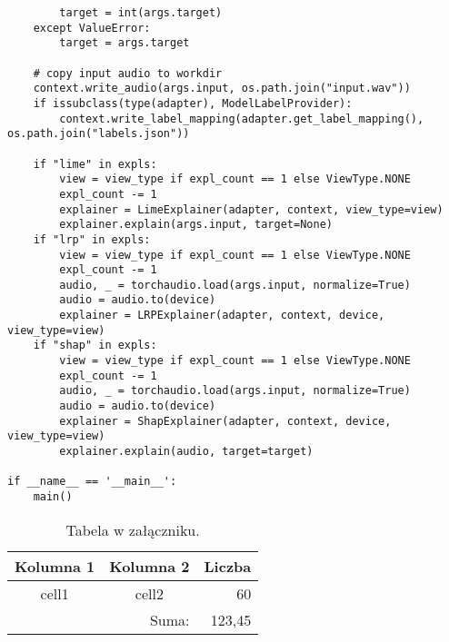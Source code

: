\documentclass[
    bindingoffset=5mm,  %
    footnoteindent=3mm, %
    hyphenation=true    %
]{src/wut-thesis}
\begin{document}
\begin{verbatim}
        target = int(args.target)
    except ValueError:
        target = args.target

    # copy input audio to workdir
    context.write_audio(args.input, os.path.join("input.wav"))
    if issubclass(type(adapter), ModelLabelProvider):
        context.write_label_mapping(adapter.get_label_mapping(), os.path.join("labels.json"))
    
    if "lime" in expls:
        view = view_type if expl_count == 1 else ViewType.NONE
        expl_count -= 1
        explainer = LimeExplainer(adapter, context, view_type=view)
        explainer.explain(args.input, target=None)
    if "lrp" in expls:
        view = view_type if expl_count == 1 else ViewType.NONE
        expl_count -= 1
        audio, _ = torchaudio.load(args.input, normalize=True)
        audio = audio.to(device)
        explainer = LRPExplainer(adapter, context, device, view_type=view)
    if "shap" in expls:
        view = view_type if expl_count == 1 else ViewType.NONE
        expl_count -= 1
        audio, _ = torchaudio.load(args.input, normalize=True)
        audio = audio.to(device)
        explainer = ShapExplainer(adapter, context, device, view_type=view)
        explainer.explain(audio, target=target)

if __name__ == '__main__':
    main()
\end{verbatim}

\clearpage
{}
\lipsum[1-2]
\begin{table}[!h] \centering
    \caption{Tabela w załączniku.}
    \begin{tabular} {| c | c | r |} \hline
        Kolumna 1       & Kolumna 2 & Liczba \\ \hline\hline
        cell1           & cell2     & 60     \\ \hline
        \multicolumn{2}{|r|}{Suma:} & 123,45 \\ \hline
    \end{tabular}
\end{table}
\lipsum[3-4]

\end{document}
